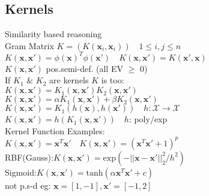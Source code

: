 \subsection*{Kernels}
Similarity based reasoning\\
Gram Matrix $K{=}(K(\mathbf{x}_i, \mathbf{x}_i))\quad 1{\leq} i,j{\leq} n$\\
$K(\mathbf{x}, \mathbf{x'}) {=} \phi(\mathbf{x})^T\phi(\mathbf{x'})\quad K(\mathbf{x},\mathbf{x'}){=}K(\mathbf{x'},\mathbf{x})$\\
$K(\mathbf{x},\mathbf{x'})$ pos.semi-def. (all EV $\geq$ 0)\\
If $K_1$ \& $K_2$ are kernels $K$ is too:\\
$K(\mathbf{x}, \mathbf{x'})=K_1(\mathbf{x}, \mathbf{x'})K_2(\mathbf{x}, \mathbf{x'})$\\
$K(\mathbf{x},\mathbf{x'})=\alpha K_1(\mathbf{x}, \mathbf{x'})+\beta K_2(\mathbf{x}, \mathbf{x'})$\\
$K(\mathbf{x},\mathbf{x'}){=}K_1(h(\mathbf{x}), h(\mathbf{x'}))\quad h:\mathcal{X}{\rightarrow}\mathcal{X}$\\
$K(\mathbf{x},\mathbf{x'}){=}h(K_1(\mathbf{x}, \mathbf{x'}))\quad h$: poly/exp\\
Kernel Function Examples:\\
$K(\mathbf{x},\mathbf{x'}){=}\mathbf{x}^T\mathbf{x'}\quad K(\mathbf{x},\mathbf{x'}){=}(\mathbf{x}^T\mathbf{x'}{+}1)^p$\\
RBF(Gauss):$K(\mathbf{x},\mathbf{x'}){=}\mathrm{exp}(-||\mathbf{x}{-}\mathbf{x'}||_2^2/h^2)$\\
Sigmoid:$K(\mathbf{x},\mathbf{x'}){=}\mathrm{tanh}(\alpha\mathbf{x}^T\mathbf{x'}+c)$\\
not p.s-d eg: $\mathbf{x}{=}[1,-1], \mathbf{x'}{=}[-1,2]$